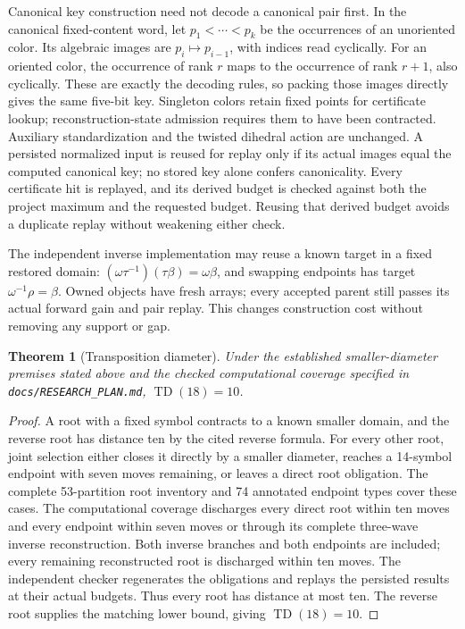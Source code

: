 \documentclass[11pt,a4paper]{article}
\newcommand{\TD}{\operatorname{TD}}
\newtheorem{theorem}{Theorem}
\begin{document}
Canonical key construction need not decode a canonical pair first. In the
canonical fixed-content word, let $p_1<\cdots<p_k$ be the occurrences of an
unoriented color. Its algebraic images are $p_i\mapsto p_{i-1}$, with indices
read cyclically. For an oriented color, the occurrence of rank $r$ maps to the
occurrence of rank $r+1$, also cyclically. These are exactly the decoding rules,
so packing those images directly gives the same five-bit key. Singleton colors
retain fixed points for certificate lookup; reconstruction-state admission
requires them to have been contracted. Auxiliary standardization and the twisted
dihedral action are unchanged. A persisted normalized input is reused for replay
only if its actual images equal the computed canonical key; no stored key alone
confers canonicality. Every certificate hit is replayed, and its derived budget
is checked against both the project maximum and the requested budget. Reusing
that derived budget avoids a duplicate replay without weakening either check.

The independent inverse implementation may reuse a known target in a fixed
restored domain: $(\omega\tau^{-1})(\tau\beta)=\omega\beta$, and swapping
endpoints has target $\omega^{-1}\rho=\beta$. Owned objects have fresh arrays;
every accepted parent still passes its actual forward gain and pair replay.
This changes construction cost without removing any support or gap.

\begin{theorem}[Transposition diameter]
\label{thm:td18}
Under the established smaller-diameter premises stated above and the checked
computational coverage specified in \nolinkurl{docs/RESEARCH_PLAN.md},
$\TD(18)=10$.
\end{theorem}
\begin{proof}
A root with a fixed symbol contracts to a known smaller domain, and the reverse
root has distance ten by the cited reverse formula. For every other root, joint
selection either closes it directly by a smaller diameter, reaches a 14-symbol
endpoint with seven moves remaining, or leaves a direct root obligation.
The complete 53-partition root inventory and 74 annotated endpoint types cover
these cases. The computational coverage discharges every direct root within ten
moves and every endpoint within seven moves or through its complete three-wave
inverse reconstruction. Both inverse branches and both endpoints are included;
every remaining reconstructed root is discharged within ten moves. The
independent checker regenerates the obligations and replays the persisted
results at their actual budgets. Thus every root has distance at most ten.
The reverse root supplies the matching lower bound, giving $\TD(18)=10$.
\end{proof}
\end{document}
